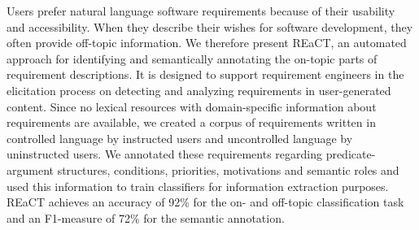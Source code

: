 Users prefer natural language software requirements because of their usability and accessibility. When they describe their wishes for software development, they often provide off-topic information. We therefore present REaCT, an automated approach for identifying and semantically annotating the on-topic parts of requirement descriptions. It is designed to support requirement engineers in the elicitation process on detecting and analyzing requirements in user-generated content. Since no lexical resources with domain-specific information about requirements are available, we created a corpus of requirements written in controlled language by instructed users and uncontrolled language by uninstructed users. We annotated these requirements regarding predicate-argument structures, conditions, priorities, motivations and semantic roles and used this information to train classifiers for information extraction purposes. REaCT achieves an accuracy of 92\% for the on- and off-topic classification task and an F1-measure of 72\% for the semantic annotation.
